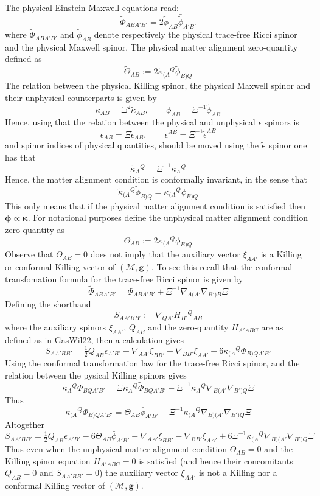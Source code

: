 \documentclass[10pt,a4paper]{article}
\theoremstyle{plain}
\def\bmg{{\bm g}}
\begin{document}
The physical Einstein-Maxwell equations read:
\[
\tilde{\Phi}_{ABA'B'}=2\tilde{\phi}_{AB}\bar{\tilde{\phi}}_{A'B'}
\]
where $\tilde{\Phi}_{ABA'B'}$ and $\tilde{\phi}_{AB}$ denote
respectively the physical trace-free Ricci spinor and the physical
Maxwell spinor.  The physical matter alignment zero-quantity defined as
\[
\tilde{\Theta}_{AB}:=2 \tilde{\kappa}_{(A}{}^{Q}\tilde{\phi}_{B)Q}
\]
The relation between the physical Killing spinor, the physical Maxwell
spinor and their unphysical counterparts is given by
\[
\kappa_{AB}=\Xi^2\tilde{\kappa}_{AB}, \qquad
\phi_{AB}=\Xi^{-1}\tilde{\phi}_{AB}
\]
Hence, using that the relation between the physical and unphysical
$\epsilon$ spinors is
\[
\epsilon_{AB}=\Xi \tilde{\epsilon}_{AB}, \qquad
\epsilon^{AB}=\Xi^{-1}\tilde{\epsilon}^{AB}
\]
and spinor indices of physical quantities, should be moved using the
$\tilde{\bm\epsilon}$ spinor one has that
\[
\tilde{\kappa}_{A}{}^{Q}=\Xi^{-1}\kappa_{A}{}^Q
\]
Hence, the matter alignment condition is conformally invariant, in the
sense that
\[
 \tilde{\kappa}_{(A}{}^{Q}\tilde{\phi}_{B)Q} =
 \kappa_{(A}{}^{Q}{\phi}_{B)Q}
 \]
 This only means that if the physical matter alignment
 condition is satisfied then $\bm\phi \propto \bm\kappa$.
 For notational purposes define the unphysical matter alignment condition zero-quantity as
\[
\Theta_{AB}:=2 \kappa_{(A}{}^{Q}\phi_{B)Q}
\]
Observe that $\Theta_{AB}=0$
does not  imply that the auxiliary vector $\xi_{AA'}$ is a Killing or conformal
 Killing vector of $(\mathcal{M},\bmg)$.
 To see this recall that the conformal
 transfomation formula for the trace-free Ricci spinor is given by
 \[
\tilde{\Phi}_{ABA'B'}=\Phi_{ABA'B'} +
\Xi^{-1}\nabla_{A(A'}\nabla_{B')B}\Xi
 \]
 Defining the shorthand
  \[
 S_{AA'BB'} := \nabla_{QA'}H_{B'}{}^{Q}{}_{AB}
 \]
 where the auxiliary spinors $\xi_{AA'}$, $Q_{AB}$ and the
 zero-quantity $H_{A'ABC}$ are as defined as in GasWil22, then a calculation gives
  \[
 S_{AA'BB'} = \tfrac{1}{2} Q_{AB}\epsilon _{A'B'}  -
 \nabla_{AA'}\xi _{BB'} - \nabla_{BB'}\xi _{AA'} -6 \kappa _{(A}{}^{Q} \Phi _{B)QA'B'}  
 \]
 Using the conformal transformation law for the trace-free Ricci spinor, and the relation
 between the pysical Killing spinors gives
 \[
\kappa_A{}^{Q}\Phi_{BQA'B'}=\Xi\tilde{\kappa}_{A}{}^Q\tilde{\Phi}_{BQA'B'}-\Xi^{-1}\kappa_{A}{}^Q\nabla_{B(A'}\nabla_{B')Q}\Xi
\]
Thus
\[
\kappa_{(A}{}^{Q}\Phi_{B)QA'B'}=\Theta_{AB}\bar{\phi}_{A'B'}-\Xi^{-1}\kappa_{(A}{}^Q\nabla_{B)(A'}\nabla_{B')Q}\Xi
\]
Altogether
  \[
 S_{AA'BB'} = \tfrac{1}{2} Q_{AB}\epsilon _{A'B'} -6 \Theta_{AB}\bar{\phi}_{A'B'}  -
 \nabla_{AA'}\xi _{BB'} - \nabla_{BB'}\xi _{AA'}  + 6 \Xi^{-1}\kappa_{(A}{}^Q\nabla_{B)(A'}\nabla_{B')Q}\Xi
 \]
 Thus even when the unphysical matter alignment condition $\Theta_{AB}=0$ and the
 Killing spinor equation $H_{A'ABC}=0$ is satisfied (and hence their concomitants $Q_{AB}=0$ and $S_{AA'BB'}=0$) the auxiliary vector $\xi_{AA'}$ is not a Killing nor a conformal Killing vector of $(\mathcal{M}, \bmg)$.
 
\end{document}
